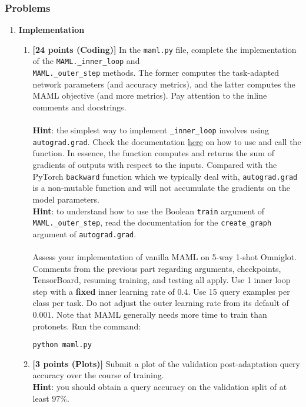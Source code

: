 \documentclass[12pt]{article}
\begin{document}
\subsubsection*{Problems}


\begin{enumerate}
    \item \textbf{Implementation}
    \begin{enumerate}
     \item \textbf{[24 points (Coding)]} In the \texttt{maml.py} file, complete the implementation of the \texttt{MAML.\_inner\_loop} and \\ \texttt{MAML.\_outer\_step} methods. The former computes the task-adapted network parameters (and accuracy metrics), and the latter computes the MAML objective (and more metrics). Pay attention to the inline comments and docstrings. \\\\
    \textbf{Hint}: the simplest way to implement \texttt{\_inner\_loop} involves using \texttt{autograd.grad}. Check the documentation \href{https://pytorch.org/docs/stable/generated/torch.autograd.grad.html}{here} on how to use and call the function. In essence, the function computes and returns the sum of gradients of outputs with respect to the inputs. Compared with the PyTorch \texttt{backward} function which we typically deal with, \texttt{autograd.grad} is a non-mutable function and will not accumulate the gradients on the model parameters.\\
    \textbf{Hint}: to understand how to use the Boolean \texttt{train} argument of \texttt{MAML.\_outer\_step}, read the documentation for the \texttt{create\_graph} argument of \texttt{autograd.grad}. \\\\
    Assess your implementation of vanilla MAML on 5-way 1-shot Omniglot. Comments from the previous part regarding arguments, checkpoints, TensorBoard, resuming training, and testing all apply. Use 1 inner loop step with a \textbf{fixed} inner learning rate of 0.4. Use 15 query examples per class per task. Do not adjust the outer learning rate from its default of $0.001$. Note that MAML generally needs more time to train than protonets. Run the command:
    
    \texttt{python maml.py}

    \newpage
    \item \textbf{[3 points (Plots)]} Submit a plot of the validation post-adaptation query accuracy over the course of training. \\
    \textbf{Hint}: you should obtain a query accuracy on the validation split of at least $97\%$.
    

\end{enumerate}
\end{enumerate}
\end{document}
